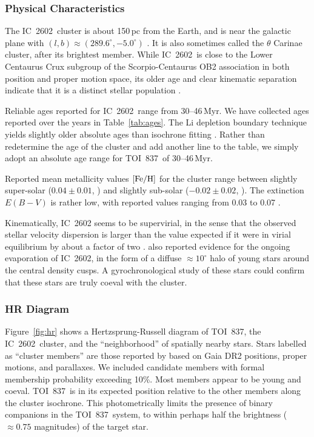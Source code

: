\documentclass[12pt,twocolumn,tighten]{aastex63}
\newcommand{\tn}{TOI~837} %
\newcommand{\cn}{IC~2602} %
\begin{document}
\subsubsection{Physical Characteristics}
\label{subsec:clusterchar}

The \cn\ cluster is about 150$\,$pc from the Earth, and is near the
galactic plane with $(l,b)\approx(289.6^\circ, -5.0^\circ)$
\citep{cantatgaudin_gaia_2018}.  It is also sometimes called the
$\theta$ Carinae cluster, after its brightest member.  While \cn\ is
close to the Lower Centaurus Crux subgroup of the Scorpio-Centaurus
OB2 association in both position and proper motion space, its older
age and clear kinematic separation indicate that it is a distinct
stellar population
\citep{de_zeeuw_hipparcos_1999,damiani_stellar_2019}.

Reliable ages reported for \cn\ range from 30--46$\,$Myr.  We have
collected ages reported over the years in Table~\ref{tab:ages}.  The
Li depletion boundary technique yields slightly older absolute ages
than isochrone fitting \citep{dobbie_ic_2010,randich_gaiaeso_2018}.
Rather than redetermine the age of the cluster and add another line to
the table, we simply adopt an absolute age range for \tn\ of
30--46$\,$Myr.

Reported mean metallicity values ${\rm [Fe/H]}$ for the cluster range
between slightly super-solar ($0.04\pm0.01$,
\citealt{baratella_gaia-eso_2020}) and slightly sub-solar ($-0.02 \pm
0.02$, \citealt{netopil_metallicity_2016}).  The extinction $E(B-V)$
is rather low, with reported values ranging from 0.03 to 0.07
\citep[{\it e.g.},][]{randich_gaiaeso_2018}.

Kinematically, IC~2602 seems to be supervirial, in the sense that the
observed stellar velocity dispersion is larger than the value expected
if it were in virial equilibrium by about a factor of two
\citep{bravi_gaia-eso_2018}.  \citet{damiani_stellar_2019} also
reported evidence for the ongoing evaporation of \cn, in the form of a
diffuse $\approx10^\circ$ halo of young stars around the central
density cusps.  A gyrochronological study of these stars could confirm
that these stars are truly coeval with the cluster.


\subsubsection{HR Diagram}
\label{subsec:hr}

Figure~\ref{fig:hr} shows a Hertzsprung-Russell diagram of \tn, the
\cn\ cluster, and the ``neighborhood'' of spatially nearby stars.
Stars labelled as ``cluster members'' are those reported by
\citet{cantatgaudin_gaia_2018} based on Gaia DR2 positions, proper
motions, and parallaxes.  We included candidate members with formal
membership probability exceeding 10\%.  Most members appear to be
young and coeval.  \tn\ is in its expected position relative to the
other members along the cluster isochrone.  This photometrically
limits the presence of binary companions in the \tn\ system, to within
perhaps half the brightness ($\approx0.75$ magnitudes) of the target
star.
\end{document}
